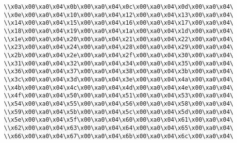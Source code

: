 \verb|\\x0a\x00\xa0\x04\x0b\x00\xa0\x04\x0c\x00\xa0\x04\x0d\x00\xa0\x04\|\newline
\verb|\\x0e\x00\xa0\x04\x10\x00\xa0\x04\x12\x00\xa0\x04\x13\x00\xa0\x04\|\newline
\verb|\\x14\x00\xa0\x04\x15\x00\xa0\x04\x16\x00\xa0\x04\x17\x00\xa0\x04\|\newline
\verb|\\x18\x00\xa0\x04\x19\x00\xa0\x04\x1a\x00\xa0\x04\x1d\x00\xa0\x04\|\newline
\verb|\\x1e\x00\xa0\x04\x20\x00\xa0\x04\x21\x00\xa0\x04\x22\x00\xa0\x04\|\newline
\verb|\\x23\x00\xa0\x04\x24\x00\xa0\x04\x28\x00\xa0\x04\x29\x00\xa0\x04\|\newline
\verb|\\x2b\x00\xa0\x04\x2e\x00\xa0\x04\x2f\x00\xa0\x04\x30\x00\xa0\x04\|\newline
\verb|\\x31\x00\xa0\x04\x32\x00\xa0\x04\x34\x00\xa0\x04\x35\x00\xa0\x04\|\newline
\verb|\\x36\x00\xa0\x04\x37\x00\xa0\x04\x38\x00\xa0\x04\x3b\x00\xa0\x04\|\newline
\verb|\\x3c\x00\xa0\x04\x3d\x00\xa0\x04\x3e\x00\xa0\x04\x4a\x00\xa0\x04\|\newline
\verb|\\x4b\x00\xa0\x04\x4c\x00\xa0\x04\x4d\x00\xa0\x04\x4e\x00\xa0\x04\|\newline
\verb|\\x4f\x00\xa0\x04\x50\x00\xa0\x04\x51\x00\xa0\x04\x53\x00\xa0\x04\|\newline
\verb|\\x54\x00\xa0\x04\x55\x00\xa0\x04\x56\x00\xa0\x04\x58\x00\xa0\x04\|\newline
\verb|\\x59\x00\xa0\x04\x5b\x00\xa0\x04\x5c\x00\xa0\x04\x5d\x00\xa0\x04\|\newline
\verb|\\x5e\x00\xa0\x04\x5f\x00\xa0\x04\x60\x00\xa0\x04\x61\x00\xa0\x04\|\newline
\verb|\\x62\x00\xa0\x04\x63\x00\xa0\x04\x64\x00\xa0\x04\x65\x00\xa0\x04\|\newline
\verb|\\x66\x00\xa0\x04\x67\x00\xa0\x04\x6b\x00\xa0\x04\x6c\x00\xa0\x04\|\newline
